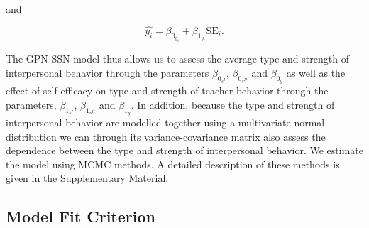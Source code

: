 \documentclass[man]{apa6}
\theoremstyle{definition}
\theoremstyle{definition}
\theoremstyle{definition}
\theoremstyle{remark}
\begin{document}
\noindent and

\[\hat{y_i} = \beta_{0_{y_i}} +
\beta_{1_{y_i}}\text{SE}_i.\]

\noindent The GPN-SSN model thus allows us to assess the average type
and strength of interpersonal behavior through the parameters
\(\beta_{0_{s^{I}}}\), \(\beta_{0_{s^{II}}}\) and \(\beta_{0_{y}}\) as
well as the effect of self-efficacy on type and strength of teacher
behavior through the parameters, \(\beta_{1_{s^{I}}}\),
\(\beta_{1_{s^{II}}}\) and \(\beta_{1_{y}}\). In addition, because the
type and strength of interpersonal behavior are modelled together using
a multivariate normal distribution we can through its
variance-covariance matrix also assess the dependence between the type
and strength of interpersonal behavior. \newline \indent We estimate the
model using MCMC methods. A detailed description of these methods is
given in the Supplementary Material.

\subsection{Model Fit Criterion}\label{Modelfit}
\end{document}
